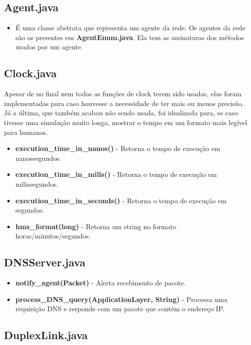 \documentclass[11pt]{article}
\begin{document}
\subsection{Agent.java}

\begin{itemize}
	\item É uma classe abstrata que representa um agente da rede. Os agentes da rede são os presentes em \textbf{AgentEnum.java}. Ela tem as assinaturas dos métodos usados por um agente.
\end{itemize}

\subsection{Clock.java}

Apesar de no final nem todas as funções de clock terem sido usadas, elas foram implementadas para caso houvesse a necessidade de ter mais ou menos precisão. Já a última, que também acabou não sendo usada, 
foi idealizada para, se caso tivesse uma simulação muito longa, mostrar o tempo em um formato mais legível para humanos.
\begin{itemize}
	\item \textbf{execution\_time\_in\_nanos()} - Retorna o tempo de execução em nanossegundos.
	\item \textbf{execution\_time\_in\_milis()} - Retorna o tempo de execução em milissegundos.
	\item \textbf{execution\_time\_in\_seconds()} - Retorna o tempo de execução em segundos.
	\item \textbf{hms\_format(long)} - Retorna um string no formato horas/minutos/segundos.
\end{itemize}

\subsection{DNSServer.java}

\begin{itemize}
	\item \textbf{notify\_agent(Packet)} - Alerta recebimento de pacote.
	\item \textbf{process\_DNS\_query(ApplicationLayer, String)} - Processa uma requisição DNS e responde com um pacote que contém o endereço IP.
\end{itemize}

\subsection{DuplexLink.java}
\end{document}
